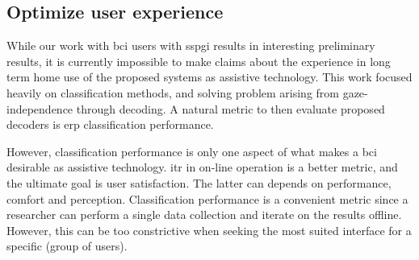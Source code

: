 %
%
%
%
%
%
%
%
\subsection{Optimize user experience}
While our work with \ac{bci} users with \ac{sspgi} results in interesting
preliminary results, it is currently impossible to make claims about the experience in long term
home use of the proposed systems as assistive technology.
This work focused heavily on classification methods, and solving problem
arising from gaze-independence through decoding.
A natural metric to then evaluate proposed decoders is \ac{erp} classification
performance.

However, classification performance is only one aspect of what makes a \ac{bci}
desirable as assistive technology.
\Ac{itr} in on-line operation is a better metric, and the ultimate goal
is user satisfaction.
The latter can depends on performance, comfort and perception.
Classification performance is a convenient metric since a researcher can perform a single
data collection and iterate on the results offline.
However, this can be too constrictive when seeking the most suited interface
for a specific (group of users).

